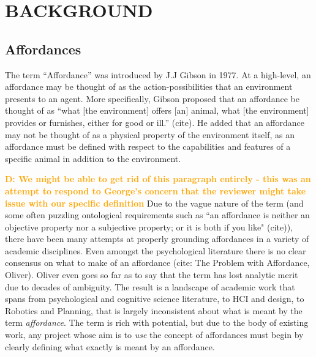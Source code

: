 \documentclass[]{article}
\newcommand{\dnote}[1]{\textcolor{Orange}{\textbf{D: #1}}}
\begin{document}


\section{BACKGROUND}

\subsection{Affordances}

The term ``Affordance'' was introduced by J.J Gibson in 1977. At a high-level, an affordance may be thought of as the action-possibilities that an environment presents to an agent. More specifically, Gibson proposed that an affordance be thought of as ``what [the
environment] offers [an] animal, what [the environment] provides or furnishes, either for good or ill.'' (cite). He added that an affordance may not be thought of as a physical property of the environment itself, as an affordance must be defined with respect to the capabilities and features of a specific animal in addition to the environment.

\dnote{We might be able to get rid of this paragraph entirely - this was an attempt to respond to George's concern that the reviewer might take issue with our specific definition}
Due to the vague nature of the term (and some often puzzling ontological requirements such as ``an affordance is neither an objective property nor a subjective property; or it is both if you like" (cite)), there have been many attempts at properly grounding affordances in a variety of academic disciplines. Even amongst the psychological literature there is no clear consensus on what to make of an affordance (cite: The Problem with Affordance, Oliver). Oliver even goes so far as to say that the term has lost analytic merit due to decades of ambiguity. The result is a landscape of academic work that spans from psychological and cognitive science literature, to HCI and design, to Robotics and Planning, that is largely inconsistent about what is meant by the term {\it affordance}. The term is rich with potential, but due to the body of existing work, any project whose aim is to {\it use} the concept of affordances must begin by clearly defining what exactly is meant by an affordance.
\end{document}

